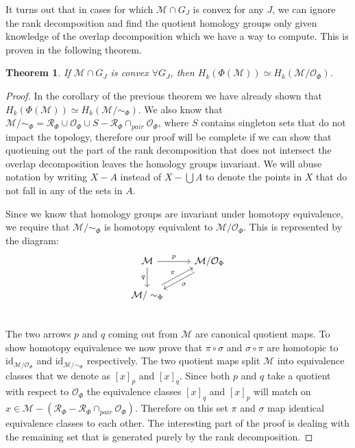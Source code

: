 \documentclass[10pt]{article} %
\theoremstyle{plain}
\newtheorem{theorem}{Theorem}[section]
\theoremstyle{definition}
\theoremstyle{remark}
\begin{document}
It turns out that in cases for which $\mathcal{M} \cap G_J$ is convex for any $J$, we can ignore the rank decomposition and find the quotient homology groups only given knowledge of the overlap decomposition which we have a way to compute. This is proven in the following theorem.

\begin{theorem}    
    \label{Convex homology proof}
    If $\mathcal{M}\cap G_J$ is convex $\forall G_J$, then $H_k(\Phi(\mathcal{M})) \simeq H_k(\mathcal{M}/\mathcal{O}_\Phi)$.
\end{theorem}

\begin{proof}
    
    In the corollary of the previous theorem we have already shown that $H_k(\Phi(\mathcal{M})) \simeq H_k(\mathcal{M}/\sim_\Phi)$. We also know that $\mathcal{M}/\sim_{\Phi}= \mathcal{R}_\Phi \cup \mathcal{O}_\Phi\cup S - \mathcal{R}_\Phi\cap_{pair}\mathcal{O}_\Phi$, {where $S$ contains singleton sets that do not impact the topology}, therefore our proof will be complete if we can show that quotiening out the part of the rank decomposition that does not intersect the overlap decomposition leaves the homology groups invariant. We will abuse notation by writing $X-A$ instead of $X-\bigcup A$ to denote the points in $X$ that do not fall in any of the sets in $A$.

    Since we know that homology groups are invariant under homotopy equivalence, we require that $\mathcal{M}/\sim_\Phi$ is homotopy equivalent to $\mathcal{M}/\mathcal{O}_\Phi$. This is represented by the diagram:
    \begin{equation*}
        \begin{tikzcd}
        \mathcal{M} \arrow[r, "p"] \arrow[d, "q"']
        & \mathcal{M}/\mathcal{O}_\Phi \arrow[ld,shift left = 1, "\sigma"] \\
        \mathcal{M}/\sim_\Phi \arrow[ru, shift left = 1, "\pi"] \\
    \end{tikzcd}
    \end{equation*}
    The two arrows $p$ and $q$ coming out from $\mathcal{M}$ are canonical quotient maps. To show homotopy equivalence we now prove that $\pi \circ \sigma$ and $\sigma \circ \pi$ are homotopic to $\text{id}_{\mathcal{M}/\mathcal{O}_\Phi}$ and $\text{id}_{\mathcal{M}/\sim_\Phi}$ respectively. The two quotient maps split $\mathcal{M}$ into equivalence classes that we denote as $[x]_p$ and $[x]_q$. Since both $p$ and $q$ take a quotient with respect to $\mathcal{O}_\Phi$ the equivalence classes $[x]_q$ and $[x]_p$ will match on $x \in \mathcal{M} - (\mathcal{R}_\Phi-\mathcal{R}_\Phi\cap_{pair}\mathcal{O}_\Phi)$. Therefore on this set $\pi$ and $\sigma$ map identical equivalence classes to each other. The interesting part of the proof is dealing with the remaining set that is generated purely by the rank decomposition.


\end{proof}
\end{document}
